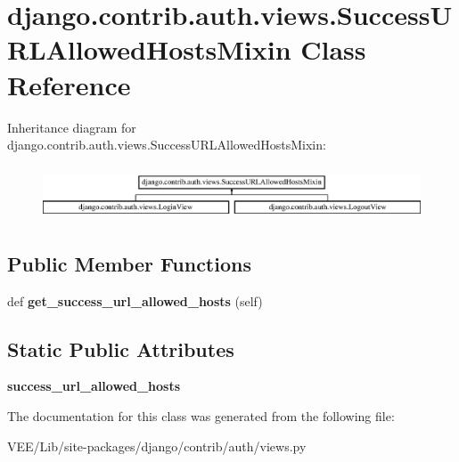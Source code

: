 \hypertarget{classdjango_1_1contrib_1_1auth_1_1views_1_1_success_u_r_l_allowed_hosts_mixin}{}\section{django.\+contrib.\+auth.\+views.\+Success\+U\+R\+L\+Allowed\+Hosts\+Mixin Class Reference}
\label{classdjango_1_1contrib_1_1auth_1_1views_1_1_success_u_r_l_allowed_hosts_mixin}
Inheritance diagram for django.\+contrib.\+auth.\+views.\+Success\+U\+R\+L\+Allowed\+Hosts\+Mixin\+:\begin{figure}[H]
\begin{center}
\leavevmode
\includegraphics[height=1.618497cm]{classdjango_1_1contrib_1_1auth_1_1views_1_1_success_u_r_l_allowed_hosts_mixin}
\end{center}
\end{figure}
\subsection*{Public Member Functions}
\begin{DoxyCompactItemize}
\item 
\mbox{\label{classdjango_1_1contrib_1_1auth_1_1views_1_1_success_u_r_l_allowed_hosts_mixin_a35458718ee4a4b45995cd75a42de04c0}} 
def {\bfseries get\+\_\+success\+\_\+url\+\_\+allowed\+\_\+hosts} (self)
\end{DoxyCompactItemize}
\subsection*{Static Public Attributes}
\begin{DoxyCompactItemize}
\item 
\mbox{\label{classdjango_1_1contrib_1_1auth_1_1views_1_1_success_u_r_l_allowed_hosts_mixin_aaa738e19e1b31aec301fc68b5e9d6c37}} 
{\bfseries success\+\_\+url\+\_\+allowed\+\_\+hosts}
\end{DoxyCompactItemize}


The documentation for this class was generated from the following file\+:\begin{DoxyCompactItemize}
\item 
V\+E\+E/\+Lib/site-\/packages/django/contrib/auth/views.\+py\end{DoxyCompactItemize}
